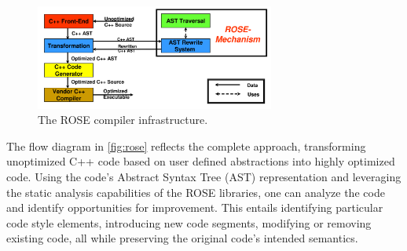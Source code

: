 \begin{figure}[h!]
    \centering
    \includegraphics[width=0.7\textwidth]{pictures/rose.png}
    \caption{The ROSE compiler infrastructure.}
    \label{fig:rose}
\end{figure}
The flow diagram in \autoref{fig:rose}  reflects the complete approach, transforming unoptimized C++ code based on user defined abstractions into highly optimized code.
Using the code's Abstract Syntax Tree (AST) representation and leveraging the static analysis capabilities of the ROSE libraries, one can analyze the code and identify opportunities for improvement. This entails identifying particular code style elements, introducing new code segments, modifying or removing existing code, all while preserving the original code's intended semantics.

